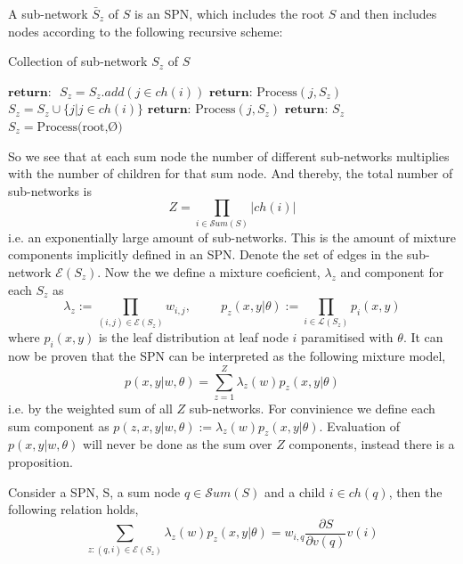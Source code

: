 \begin{definition} 
    A sub-network $\bar S_z$ of $S$ is an SPN, which includes the root $S$ and then includes nodes
    according to the following recursive scheme: 
\end{definition}
\begin{algorithm}[H]
    \caption*{Collection of sub-network $S_z$ of $S$}\label{SPN4}
    \begin{algorithmic}
        \State  $\textbf{return: }$ 
    \EndIf
        \State $S_z =S_z.add(j \in ch(i))$ 
        \State $\textbf{return: } \text{Process}(j, S_z)$
    \EndIf
        \State $S_z =S_z \cup \{j | j \in ch(i)\}$ 
            \State $\textbf{return: } \text{Process}(j,S_z)$
        \EndFor
    \EndIf
    \State $\textbf{return: } S_z$
    \EndFunction
    \State $S_z =  \text{Process(root,Ø)}$
    \end{algorithmic}
\end{algorithm}
So we see that at each sum node the number of different sub-networks multiplies with the number of children for that
sum node. And thereby, the total number of sub-networks is
 $$Z = \prod_{i\in \mathcal{S}um(S)}|ch(i)|$$ 
 i.e. an exponentially large amount of sub-networks. This is the amount of
 mixture components implicitly defined in an SPN. 
 Denote the set of edges in the sub-network $\mathcal{E}(S_z)$.
Now the we define a mixture coeficient, $\lambda_z$ and component for each $S_z$ as 
$$\lambda_z := \prod_{(i,j)\in \mathcal{E}(S_z)} w_{i,j}, \hspace{1cm}
p_z(x,y|\theta) := \prod_{i \in \mathcal{L}(S_z)} p_i(x,y)$$
where $p_i(x,y)$ is the leaf distribution at leaf node $i$ paramitised with $\theta$. 
It can now be proven that the SPN can be interpreted as the following mixture model, 
$$p(x,y|w,\theta) = \sum_{z=1}^Z \lambda_z(w)p_z(x,y|\theta)$$
i.e. by the weighted sum of all $Z$ sub-networks. For convinience
we define each sum component as $p(z,x,y|w,\theta) := \lambda_z(w)p_z(x,y|\theta)$.
Evaluation of $p(x,y|w,\theta)$ will never be done as the sum over $Z$ components, 
instead there is a proposition. 

\begin{proposition}
    Consider a SPN, S, a sum node $q \in \mathcal{S}um(S)$ and a child $i \in ch(q)$,
    then the following relation holds, 
    $$\sum_{z:(q,i)\in \mathcal{E}(S_z)} \lambda_z(w) p_z(x,y|\theta) = w_{i,q}
    \frac{\partial S}{\partial v(q)} v(i)$$
\end{proposition}


